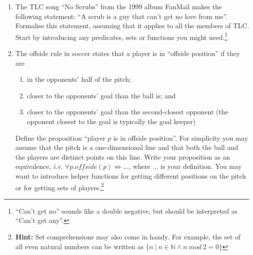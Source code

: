 \documentclass{tufte-handout}
\newcounter{example}
\newcounter{theExerciseCounter}
\begin{document}
\begin{enumerate}

\item\label{ex:tlc} The TLC song ``No Scrubs'' from the 1999 album
  FanMail makes the following statement: ``A scrub is a guy that
  can't get no love from me''. Formalise this statement, assuming
  that it applies to all the members of TLC. Start by introducing
  any predicates, sets or functions you might
  need.\footnote{``Can't get no'' sounds like a double negative,
    but should be interpreted as ``Can't get any''.}

\item\label{ex:offside} The offside rule in soccer states that a player is in
  ``offside position'' if they are
  \begin{enumerate}
  \item in the opponents' half of the pitch;
  \item closer to the opponents' goal than the ball is; and
  \item closer to the opponents' goal than the second-closest
    opponent (the opponent closest to the goal is typically the
    goal keeper)
  \end{enumerate}

  Define the proposition ``player $p$ is in offside position''.
  For simplicity you may assume that the pitch is a
  one-dimensional line and that both the ball and the players are
  distinct points on this line. Write your proposition as an
  equivalence, \emph{i.e.} $\forall p. \mathit{offside}(p) \iff \dots$,
  where $\dots$ is your definition. You may want to introduce
  helper functions for getting different positions on the pitch or
  for getting sets of players.\footnote{\textbf{Hint:} Set
    comprehensions may also come in handy. For example, the set of
    all even natural numbers can be written as
    $\{n ~|~ n \in \mathbb{N} \land n~mod~2 = 0\}$}
\setcounter{theExerciseCounter}{\value{enumi}}
\end{enumerate}
\end{document}
